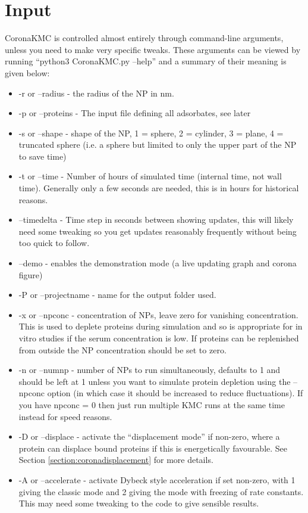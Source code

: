 \documentclass[10pt,a4paper,onecolumn]{report}
\begin{document}
 \section{Input}
CoronaKMC is controlled almost entirely through command-line arguments, unless you need to make very specific tweaks. These arguments can be viewed by running ``python3 CoronaKMC.py --help'' and a summary of their meaning is given below:
 \begin{itemize}
 \item -r or --radius - the radius of the NP in nm. 
 \item -p or --proteins - The input file defining all adsorbates, see later
\item -s or --shape - shape of the NP,   1 = sphere, 2 = cylinder, 3 = plane, 4 = truncated sphere (i.e. a sphere but limited to only the upper part of the NP to save time)
\item -t or --time - Number of hours of simulated time (internal time, not wall time). Generally only a few seconds are needed, this is in hours for historical reasons.
\item --timedelta - Time step in seconds between showing updates, this will likely need some tweaking so you get updates reasonably frequently without being too quick to follow.
\item --demo - enables the demonstration mode (a live updating graph and corona figure)
\item -P or --projectname - name for the output folder used. 
\item -x or --npconc - concentration of NPs, leave zero for vanishing concentration. This is used to deplete proteins during simulation and so is appropriate for in vitro studies if the serum concentration is low. If proteins can be replenished from outside the NP concentration should be set to zero.
\item  -n or --numnp - number of NPs to run simultaneously, defaults to 1 and should be left at 1 unless you want to simulate protein depletion using the --npconc option (in which case it should be increased to reduce fluctuations). If you have npconc = 0 then just run multiple KMC runs at the same time instead for speed reasons.
\item  -D or --displace - activate the ``displacement mode'' if non-zero, where a protein can displace bound proteins if this is energetically favourable.  See Section \ref{section:coronadisplacement} for more details.
\item -A or --accelerate - activate Dybeck style acceleration if set non-zero, with 1 giving the classic mode and 2 giving the mode with freezing of rate constants. This may need some tweaking to the code to give sensible results. 

\end{itemize}
\end{document}
